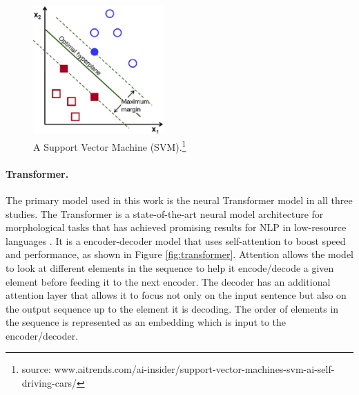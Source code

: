 
\begin{figure}[b]
    \centering
    \includegraphics[width=5cm]{figs/SVM1.jpg}
    \caption[Support Vector Machine]{A Support Vector Machine (SVM).\footnote{source: www.aitrends.com/ai-insider/support-vector-machines-svm-ai-self-driving-cars/}}
    \label{fig:SVM}
\end{figure}

\paragraph{Transformer.} 
The primary model used in this work is the neural Transformer model \citep{vaswani_attention_2017} in all three studies. The Transformer is a state-of-the-art neural model architecture for morphological tasks \citep{vylomova2020sigmorphon} that has achieved promising results for NLP in low-resource languages \citep{abbott_towards_2018,Martinus2019AFO}. 
It is a encoder-decoder model that uses self-attention to boost speed and performance, as shown in Figure \ref{fig:transformer}. Attention allows the model to look at different elements in the sequence to help it encode/decode a given element before feeding it to the next encoder. The decoder has an additional attention layer that allows it to focus not only on the input sentence but also on the output sequence up to the element it is decoding. The order of elements in the sequence is represented as an embedding which is input to the encoder/decoder. 

